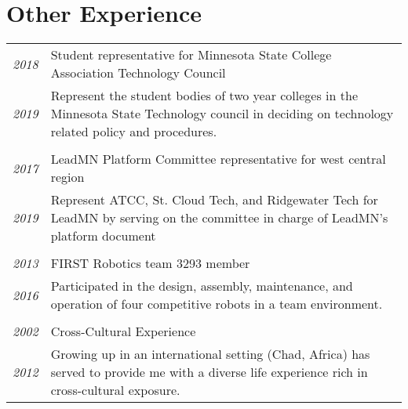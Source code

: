 \documentclass[letterpaper,10pt]{article}
\begin{document}
\section*{Other Experience}
	\begin{tabular}{R{2cm}|p{14cm}}
	\textsl{2018} & Student representative for Minnesota State College Association Technology Council\\
	\textsl{2019} & \footnotesize{Represent the student bodies of two year colleges in the Minnesota State Technology council in deciding on technology related policy and procedures.}\\
	\\
	\textsl{2017} & LeadMN Platform Committee representative for west central region\\
	\textsl{2019} & \footnotesize{Represent ATCC, St. Cloud Tech, and Ridgewater Tech for LeadMN by serving on the committee in charge of LeadMN's platform document}\\
	\\
	\textsl{2013} & FIRST Robotics team 3293 member\\
	\textsl{2016} & \footnotesize{Participated in the design, assembly, maintenance, and operation of four competitive robots in a team environment.}\\
	\\
	\textsl{2002} & Cross-Cultural Experience\\
	\textsl{2012} &\footnotesize{Growing up in an international setting (Chad, Africa) has served to provide me with a diverse life experience rich in cross-cultural exposure.}\\
	\end{tabular}
{\let\thefootnote\relax{}} 
\end{document}
